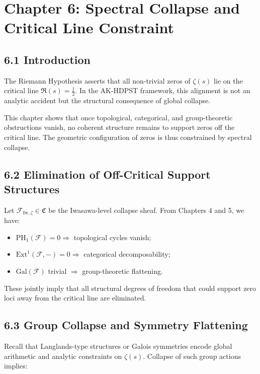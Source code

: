 \documentclass[11pt]{article}
\begin{document}
\section*{Chapter 6: Spectral Collapse and Critical Line Constraint}

\subsection*{6.1 Introduction}

The Riemann Hypothesis asserts that all non-trivial zeros of \( \zeta(s) \) lie on the critical line \( \Re(s) = \tfrac{1}{2} \). In the AK-HDPST framework, this alignment is not an analytic accident but the structural consequence of global collapse.

This chapter shows that once topological, categorical, and group-theoretic obstructions vanish, no coherent structure remains to support zeros off the critical line. The geometric configuration of zeros is thus constrained by spectral collapse.

\subsection*{6.2 Elimination of Off-Critical Support Structures}

Let \( \mathcal{F}_{\mathrm{Iw},\zeta} \in \mathfrak{C} \) be the Iwasawa-level collapse sheaf. From Chapters 4 and 5, we have:

\begin{itemize}
  \item \( \mathrm{PH}_1(\mathcal{F}) = 0 \Rightarrow \) topological cycles vanish;
  \item \( \mathrm{Ext}^1(\mathcal{F}, -) = 0 \Rightarrow \) categorical decomposability;
  \item \( \mathrm{Gal}(\mathcal{F}) \) trivial \( \Rightarrow \) group-theoretic flattening.
\end{itemize}

These jointly imply that all structural degrees of freedom that could support zero loci away from the critical line are eliminated.

\subsection*{6.3 Group Collapse and Symmetry Flattening}

Recall that Langlands-type structures or Galois symmetries encode global arithmetic and analytic constraints on \( \zeta(s) \). Collapse of such group actions implies:
\end{document}
